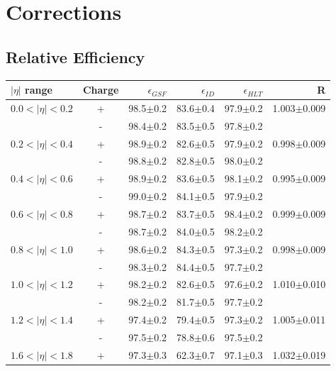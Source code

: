 \section{Corrections}

\subsection{Relative Efficiency}


\begin{table}[htbp]
\begin{center}
\begin{tabular}{lcrrrr}
$|\eta|$ range & Charge & $\epsilon_{GSF}$ &$\epsilon_{ID}$&$\epsilon_{HLT}$& R\\
\hline
$0.0<| \eta |<0.2$ &+& 98.5$\pm$0.2 &83.6$\pm$0.4 &97.9$\pm$0.2 &1.003$\pm$0.009\\
                   &-& 98.4$\pm$0.2 &83.5$\pm$0.5 &97.8$\pm$0.2 & \\
$0.2<| \eta |<0.4$ &+& 98.9$\pm$0.2 &82.6$\pm$0.5 &97.9$\pm$0.2 & 0.998$\pm$0.009\\
                   &-& 98.8$\pm$0.2 &82.8$\pm$0.5 &98.0$\pm$0.2 & \\
$0.4<| \eta |<0.6$ &+& 98.9$\pm$0.2&83.6$\pm$0.5 &98.1$\pm$0.2 & 0.995$\pm$0.009\\
                   &-& 99.0$\pm$0.2 &84.1$\pm$0.5 &97.9$\pm$0.2 & \\
$0.6<| \eta |<0.8$ &+& 98.7$\pm$0.2 &83.7$\pm$0.5 &98.4$\pm$0.2 & 0.999$\pm$0.009\\
                   &-& 98.7$\pm$0.2 &84.0$\pm$0.5&98.2$\pm$0.2 & \\
$0.8<| \eta |<1.0$ &+& 98.6$\pm$0.2 &84.3$\pm$0.5 &97.3$\pm$0.2 & 0.998$\pm$0.009\\
                   &-& 98.3$\pm$0.2 &84.4$\pm$0.5 &97.7$\pm$0.2 & \\
$1.0<| \eta |<1.2$ &+& 98.2$\pm$0.2 &82.6$\pm$0.5 &97.6$\pm$0.2 & 1.010$\pm$0.010\\
                   &-& 98.2$\pm$0.2 &81.7$\pm$0.5 &97.7$\pm$0.2 & \\
$1.2<| \eta |<1.4$ &+& 97.4$\pm$0.2 &79.4$\pm$0.5 &97.3$\pm$0.2 & 1.005$\pm$0.011\\
                   &-& 97.5$\pm$0.2 &78.8$\pm$0.6 &97.5$\pm$0.2 & \\
$1.6<| \eta |<1.8$ &+& 97.3$\pm$0.3 &62.3$\pm$0.7 &97.1$\pm$0.3 & 1.032$\pm$0.019\\

\end{tabular}
\end{center}
\end{table}
